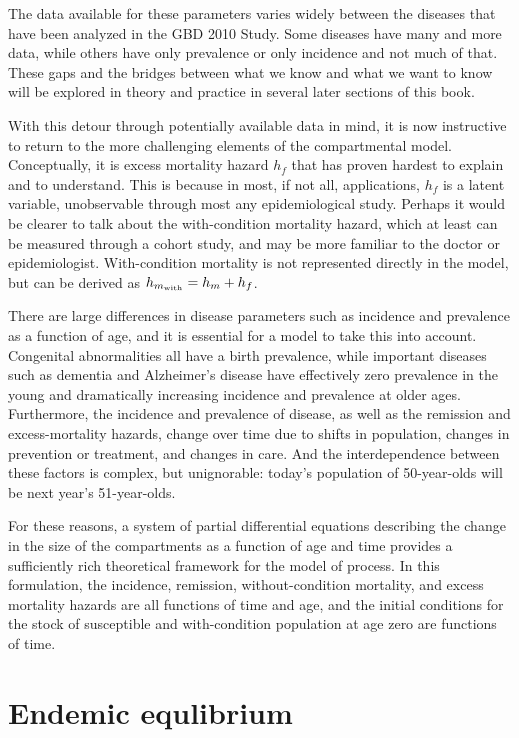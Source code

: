 The data available for these parameters varies widely between the
diseases that have been analyzed in the GBD 2010 Study. Some diseases
have many and more data, while others have only prevalence or only
incidence and not much of that. These gaps and the bridges between
what we know and what we want to know will be explored in theory and
practice in several later sections of this book.

With this detour through potentially available data in mind, it is now
instructive to return to the more challenging elements of the
compartmental model. Conceptually, it is excess mortality hazard $h_f$
that has proven hardest to explain and to understand. This is because
in most, if not all, applications, $h_f$ is a latent variable,
unobservable through most any epidemiological study. Perhaps it would
be clearer to talk about the with-condition mortality hazard, which at
least can be measured through a cohort study, and may be more familiar
to the doctor or epidemiologist. With-condition mortality is not
represented directly in the model, but can be derived as
$h_{m_{\text{with}}} = h_m+h_f$.

There are large differences in disease parameters such as incidence
and prevalence as a function of age, and it is essential for a model
to take this into account.  Congenital abnormalities all have a birth
prevalence, while important diseases such as dementia and Alzheimer's
disease have effectively zero prevalence in the young and
dramatically increasing incidence and prevalence at older
ages. Furthermore, the incidence and prevalence of disease, as well as
the remission and excess-mortality hazards, change over time due to
shifts in population, changes in prevention or treatment, and changes
in care. And the interdependence between these factors is complex, but
unignorable: today's population of 50-year-olds will be next year's
51-year-olds.

For these reasons, a system of partial differential equations
describing the change in the size of the compartments as a function of
age and time provides a sufficiently rich theoretical framework for
the model of process.  In this formulation, the incidence, remission,
without-condition mortality, and excess mortality hazards are all
functions of time and age, and the initial conditions for the stock of
susceptible and with-condition population at age zero are functions of
time.

\section{Endemic equlibrium}
\label{theory-forward_sim-compartmental_model-simplying_assumptions}

